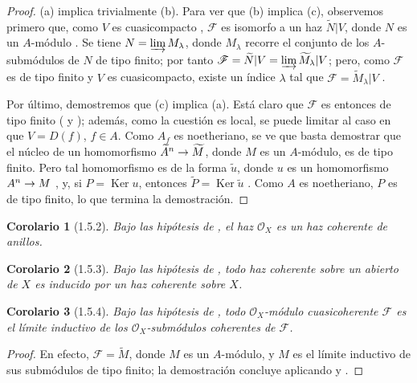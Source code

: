 \documentclass[oneside]{amsart}
\theoremstyle{ega-env-style}
\theoremstyle{ega-thm-env-style}
\newtheorem*{corollary}{Corolario}
\theoremstyle{ega-defn-env-style}
\renewcommand{\to}{\mathchoice{\longrightarrow}{\rightarrow}{\rightarrow}{\rightarrow}}
\newcommand{\oldpage}[2][]{{\marginnote{\normalfont{\textbf{#1}~|~#2}}}\ignorespaces}
\let\EGAOriginalLabel\label
\renewcommand{\label}[1]{\phantomsection\EGAOriginalLabel{#1}}
\begin{document}
\begin{proof}
\oldpage[I]{93}
(a) implica trivialmente (b).
Para ver que (b) implica (c), observemos primero que, como $V$ es cuasicompacto , $\mathscr{F}$ es isomorfo a un haz $\widetilde{N}|V$, donde $N$ es un $A$-módulo .
Se tiene $N=\varinjlim M_\lambda$, donde $M_\lambda$ recorre el conjunto de los $A$-submódulos de $N$ de tipo finito; por tanto  $\mathscr{F}=\widetilde{N}|V=\varinjlim\widetilde{M}_\lambda|V$;
pero, como $\mathscr{F}$ es de tipo finito y $V$ es cuasicompacto, existe un índice $\lambda$ tal que $\mathscr{F}=\widetilde{M}_\lambda|V$ .

Por último, demostremos que (c) implica (a).
Está claro que $\mathscr{F}$ es entonces de tipo finito ( y );
además, como la cuestión es local, se puede limitar al caso en que $V=D(f)$, $f\in A$.
Como $A_f$ es noetheriano, se ve que basta demostrar que el núcleo de un homomorfismo $\widetilde{A}^n\to\widetilde{M}$, donde $M$ es un $A$-módulo, es de tipo finito.
Pero tal homomorfismo es de la forma $\widetilde{u}$, donde $u$ es un homomorfismo $A^n\to M$ , y, si $P=\operatorname{Ker}u$, entonces $\widetilde{P}=\operatorname{Ker}\widetilde{u}$ .
Como $A$ es noetheriano, $P$ es de tipo finito, lo que termina la demostración.
\end{proof}

\begin{corollary}[1.5.2]
\label{I.1.5.2}
Bajo las hipótesis de , el haz $\mathscr{O}_X$ es un haz coherente de anillos.
\end{corollary}

\begin{corollary}[1.5.3]
\label{I.1.5.3}
Bajo las hipótesis de , todo haz coherente sobre un abierto de $X$ es inducido por un haz coherente sobre $X$.
\end{corollary}

\begin{corollary}[1.5.4]
\label{I.1.5.4}
Bajo las hipótesis de , todo $\mathscr{O}_X$-módulo cuasicoherente $\mathscr{F}$ es el límite inductivo de los $\mathscr{O}_X$-submódulos coherentes de $\mathscr{F}$.
\end{corollary}

\begin{proof}
En efecto, $\mathscr{F}=\widetilde{M}$, donde $M$ es un $A$-módulo, y $M$ es el límite inductivo de sus submódulos de tipo finito;
la demostración concluye aplicando  y .
\end{proof}
\end{document}
